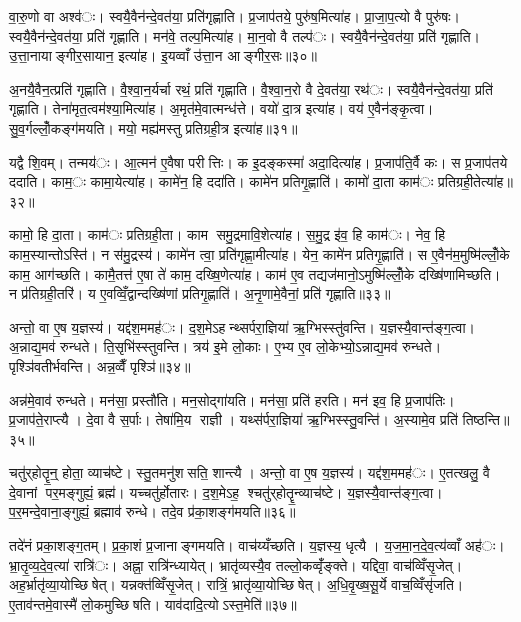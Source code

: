 वा॒रु॒णो वा अश्व॑ः। स्वयै॒वैन॑न्दे॒वत॑या॒ प्रति॑गृह्णाति। प्र॒जाप॑तये॒ पुरु॑ष॒मित्या॑ह। प्रा॒जा॒प॒त्यो वै पुरु॑षः। स्वयै॒वैन॑न्दे॒वत॑या॒ प्रति॑ गृह्णाति। मन॑वे॒ तल्प॒मित्या॑ह। मा॒न॒वो वै तल्प॑ः। स्वयै॒वैन॑न्दे॒वत॑या॒ प्रति॑ गृह्णाति। उ॒त्ता॒नायाङ्गीर॒सायान॒ इत्या॑ह। इ॒यव्वाँ उ॑त्ता॒न आङ्गीर॒सः॥३०॥

अ॒नयै॒वैन॒त्प्रति॑ गृह्णाति। वै॒श्वा॒न॒र्यर्चा रथं॒ प्रति॑ गृह्णाति। वै॒श्वा॒न॒रो वै दे॒वत॑या॒ रथ॑ः। स्वयै॒वैन॑न्दे॒वत॑या॒ प्रति॑ गृह्णाति। तेना॑मृत॒त्वम॑श्या॒मित्या॑ह। अ॒मृत॑मे॒वात्मन्ध॑त्ते। वयो॑ दा॒त्र इत्या॑ह। वय॑ ए॒वैन॑ङ्कृ॒त्वा। सु॒व॒र्गल्लोँ॒कङ्ग॑मयति। मयो॒ मह्य॑मस्तु प्रतिग्रही॒त्र इत्या॑ह॥३१॥

यद्वै शि॒वम्। तन्मय॑ः। आ॒त्मन॑ ए॒वैषा परीत्तिः। क इ॒दङ्कस्मा॑ अदा॒दित्या॑ह। प्र॒जाप॑ति॒र्वै कः। स प्र॒जाप॑तये ददाति। काम॒ः कामा॒येत्या॑ह। कामे॑न॒ हि ददा॑ति। कामे॑न प्रतिगृ॒ह्णाति॑। कामो॑ दा॒ता काम॑ः प्रतिग्रही॒तेत्या॑ह॥३२॥

कामो॒ हि दा॒ता। काम॑ः प्रतिग्रही॒ता। काम समु॒द्रमावि॒शेत्या॑ह। स॒मु॒द्र इ॑व॒ हि काम॑ः। नेव॒ हि काम॒स्यान्तोऽस्ति॑। न स॑मु॒द्रस्य॑। कामे॑न त्वा॒ प्रति॑गृह्णा॒मीत्या॑ह। येन॒ कामे॑न प्रतिगृ॒ह्णाति॑। स ए॒वैन॑म॒मुष्मि॑ल्लोँ॒के काम॒ आग॑च्छति। कामै॒तत्त॑ ए॒षा ते॑ काम॒ दख्षि॒णेत्या॑ह। काम॑ ए॒व तद्यज॑मानो॒ऽमुष्मि॑ल्लोँ॒के दख्षि॑णामिच्छति। न प्र॑तिग्रही॒तरि॑। य ए॒वव्विँ॒द्वान्दख्षि॑णां प्रतिगृ॒ह्णाति॑। अ॒नृ॒णामे॒वैनां॒ प्रति॑ गृह्णाति॥३३॥


अन्तो॒ वा ए॒ष य॒ज्ञस्य॑। यद्द॑श॒ममह॑ः। द॒श॒मेऽहन्थ्सर्परा॒ज्ञिया॑ ऋ॒ग्भिस्स्तु॑वन्ति। य॒ज्ञस्यै॒वान्त॑ङ्ग॒त्वा। अ॒न्नाद्य॒मव॑ रुन्धते। ति॒सृभि॑स्स्तुवन्ति। त्रय॑ इ॒मे लो॒काः। ए॒भ्य ए॒व लो॒केभ्यो॒ऽन्नाद्य॒मव॑ रुन्धते। पृश्ञि॑वतीर्भवन्ति। अन्न॒व्वैँ पृश्ञि॑॥३४॥

अन्न॑मे॒वाव॑ रुन्धते। मन॑सा॒ प्रस्तौ॑ति। मन॒सोद्गा॑यति। मन॑सा॒ प्रति॑ हरति। मन॑ इव॒ हि प्र॒जाप॑तिः। प्र॒जाप॑ते॒राप्त्यै। दे॒वा वै स॒र्पाः। तेषा॑मि॒य राज्ञी। यथ्स॑र्परा॒ज्ञिया॑ ऋ॒ग्भिस्स्तु॒वन्ति॑। अ॒स्यामे॒व प्रति॑ तिष्ठन्ति॥३५॥

चतु॑र्‌होतॄ॒न्॒ होता॒ व्याच॑ष्टे। स्तु॒तमनु॑शसति॒ शान्त्यै। अन्तो॒ वा ए॒ष य॒ज्ञस्य॑। यद्द॑श॒ममह॑ः। ए॒तत्खलु॒ वै दे॒वानां पर॒मङ्गुह्यं॒ ब्रह्म॑। यच्चतु॑र्होतारः। द॒श॒मेऽह॒ श्चतु॑र्‌होतॄ॒न्व्याच॑ष्टे। य॒ज्ञस्यै॒वान्त॑ङ्ग॒त्वा। प॒र॒मन्दे॒वाना॒ङ्गुह्यं॒ ब्रह्माव॑ रुन्धे। तदे॒व प्र॑का॒शङ्ग॑मयति॥३६॥

तदे॑नं प्रका॒शङ्ग॒तम्। प्र॒का॒शं प्र॒जानाङ्गमयति। वाच॑य्यँच्छति। य॒ज्ञस्य॒ धृत्यै। य॒ज॒मा॒न॒दे॒व॒त्य॑व्वाँ अह॑ः। भ्रा॒तृ॒व्य॒दे॒व॒त्या॑ रात्रि॑ः। अह्ना॒ रात्रि॑न्ध्यायेत्। भ्रातृ॑व्यस्यै॒व तल्लो॒कव्वृँ॑ङ्क्ते। यद्दिवा॒ वाच॑व्विँसृ॒जेत्। अह॒र्भ्रातृ॑व्या॒योच्छिषेत्। यन्नक्त॑व्विँसृ॒जेत्। रात्रिं॒ भ्रातृ॑व्या॒योच्छिषेत्। अ॒धि॒वृ॒ख्ष॒सू॒र्ये वाच॒व्विँसृ॑जति। ए॒ताव॑न्तमे॒वास्मै॑ लो॒कमुच्छिषति। याव॑दादि॒त्योऽस्त॒मेति॑॥३७॥

